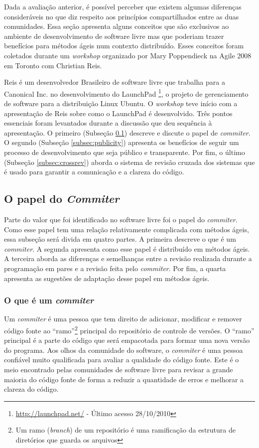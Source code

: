 Dada a avaliação anterior, é possível perceber que existem algumas
diferenças consideráveis no que diz respeito aos princípios
compartilhados entre as duas comunidades. Essa seção apresenta alguns
conceitos que são exclusivos ao ambiente de desenvolvimento de
software livre mas que poderiam trazer benefícios para métodos ágeis
num contexto distribuído. Esses conceitos foram coletados durante um
\emph{workshop} organizado por Mary Poppendieck na Agile 2008 em
Toronto com Christian Reis.

Reis é um desenvolvedor Brasileiro de software livre que trabalha para
a Canonical Inc. no desenvolvimento do LaunchPad
\footnote{\url{http://launchpad.net/} - Último acesso 28/10/2010}, o
projeto de gerenciamento de software para a distribuição Linux
Ubuntu. O \emph{workshop} teve início com a apresentação de Reis sobre
como o LaunchPad é desenvolvido. Três pontos essenciais foram
levantados durante a discussão que deu sequência à apresentação. O
primeiro (Subseção \ref{subsec:commiter}) descreve e discute o papel
de \emph{commiter}.  O segundo (Subseção \ref{subsec:publicity})
apresenta os benefícios de seguir um processo de desenvolvimento que
seja público e transparente.  Por fim, o último (Subseção
\ref{subsec:crossrev}) aborda o sistema de revisão cruzada dos
sistemas que é usado para garantir a comunicação e a clareza do
código.

\subsection{O papel do \emph{Commiter}}
\label{subsec:commiter}

Parte do valor que foi identificado no software livre foi o papel do
\emph{commiter}. Como esse papel tem uma relação relativamente
complicada com métodos ágeis, essa subseção será divida em quatro
partes. A primeira descreve o que é um \emph{commiter}. A segunda
apresenta como esse papel é distribuído em métodos ágeis. A terceira
aborda as diferenças e semelhanças entre a revisão realizada durante a
programação em pares e a revisão feita pelo \emph{commiter}. Por fim,
a quarta apresenta as sugestões de adaptação desse papel em métodos
ágeis.

\subsubsection{O que é um \emph{commiter}}

Um \emph{commiter} é uma pessoa que tem direito de adicionar,
modificar e remover código fonte ao ``ramo''\footnote{Um ramo
  (\emph{branch}) de um repositório é uma ramificação da estrutura de
  diretórios que guarda os arquivos} principal do repositório de
controle de versões. O ``ramo'' principal é a parte do código que será
empacotada para formar uma nova versão do programa. Aos olhos da
comunidade do software, o \emph{commiter} é uma pessoa confiável muito
qualificada para avaliar a qualidade do código fonte. Este é o meio
encontrado pelas comunidades de software livre para revisar a grande
maioria do código fonte de forma a reduzir a quantidade de erros e
melhorar a clareza do código.

